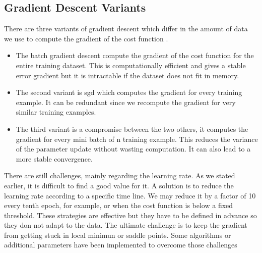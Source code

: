 \subsection{Gradient Descent Variants}
There are three variants of gradient descent which differ in the amount of data we use to compute the gradient of the cost function \cite{gradient}. 
\begin{itemize}
    \item The batch gradient descent compute the gradient of the cost function for the entire training dataset. This is computationally efficient and gives a stable error gradient but it is intractable if the dataset does not fit in memory. 
    \item The second variant is \gls{sgd} which computes the gradient for every training example. It can be redundant since we recompute the gradient for very similar training examples.
    \item The third variant is a compromise between the two others, it computes the gradient for every mini batch of n training example. This reduces the variance of the parameter update without wasting computation. It can also lead to a more stable convergence.
\end{itemize}There are still challenges, mainly regarding the learning rate. As we stated earlier, it is difficult to find a good value for it. A solution is to reduce the learning rate according to a specific time line. We may reduce it by a factor of 10 every tenth epoch, for example, or when the cost function is below a fixed threshold. These strategies are effective but they have to be defined in advance so they don not adapt to the data. The ultimate challenge is to keep the gradient from getting stuck in local minimun or saddle points. Some algorithms or additional parameters have been implemented to overcome those challenges
